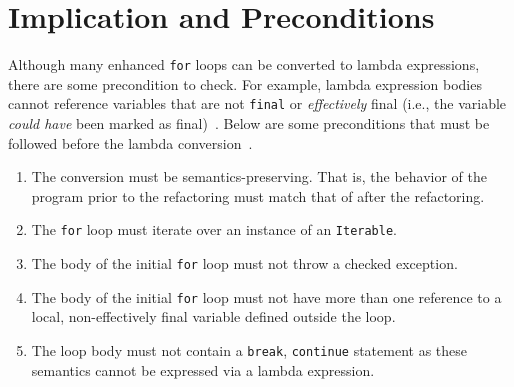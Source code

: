 \section{Implication and Preconditions}

Although many enhanced \lstinline{for} loops can be converted to lambda
expressions, there are some precondition to check. For example, lambda
expression bodies cannot reference variables that are not \lstinline{final} or
\emph{effectively} final (i.e., the variable \emph{could have} been marked as final)~\cite{gosling2014java}.  Below are some preconditions that must be followed
before the lambda conversion~\cite{gyori2013}. 

\begin{enumerate}

    \item The conversion must be semantics-preserving. That is, the behavior
        of the program prior to the refactoring must match that of after the
        refactoring.

    \item The \lstinline{for} loop must iterate over an instance of an
        \lstinline{Iterable}.

    \item The body of the initial \lstinline{for} loop must not throw a
        checked exception. 

    \item The body of the initial \lstinline{for} loop must not have more than
        one reference to a local, non-effectively final variable defined
        outside the loop.

    \item The loop body must not contain a \lstinline{break},
        \lstinline{continue} statement as these semantics cannot be expressed
        via a lambda expression.  

\end{enumerate}
